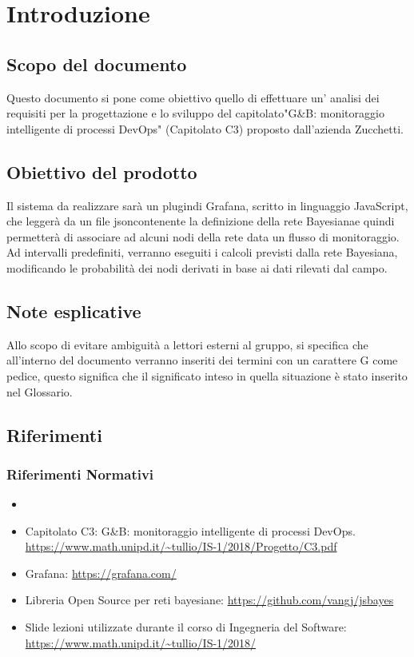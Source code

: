 \section{Introduzione}
		\subsection{Scopo del documento}			
Questo documento si pone come obiettivo quello di effettuare un' analisi dei requisiti per la progettazione e lo sviluppo del capitolato\pedice"G\&B: monitoraggio intelligente di processi DevOps\pedice" (Capitolato C3) proposto dall'azienda Zucchetti\pedice.


		\subsection{Obiettivo del prodotto}

Il sistema da realizzare sarà  un plugin\pedice di Grafana\pedice, scritto in linguaggio JavaScript\pedice, che leggerà da un file json\pedice contenente la definizione della rete Bayesiana\pedice e quindi permetterà di associare ad alcuni nodi della rete data un flusso di monitoraggio\pedice.
Ad intervalli predefiniti, verranno eseguiti i calcoli previsti dalla rete Bayesiana, modificando le probabilità dei nodi derivati in base ai dati rilevati dal campo.


		\subsection{Note esplicative}

Allo scopo di evitare ambiguità a lettori esterni al gruppo, si specifica che all'interno del documento verranno inseriti dei termini con un carattere G come pedice, questo significa che il significato inteso in quella situazione è stato inserito nel Glossario.

		\subsection{Riferimenti}
		\subsubsection{Riferimenti Normativi}
		\begin{itemize}
			\item \NdP
			\item Capitolato C3: G\&B: monitoraggio intelligente di processi DevOps.\newline
			\url{https://www.math.unipd.it/~tullio/IS-1/2018/Progetto/C3.pdf}
			\item Grafana:\newline
			\url{https://grafana.com/}
			\item Libreria Open Source per reti bayesiane:\newline
			\url{https://github.com/vangj/jsbayes}
			\item Slide lezioni utilizzate durante il corso di Ingegneria del Software:\newline
			\url{https://www.math.unipd.it/~tullio/IS-1/2018/}
		\end{itemize}
